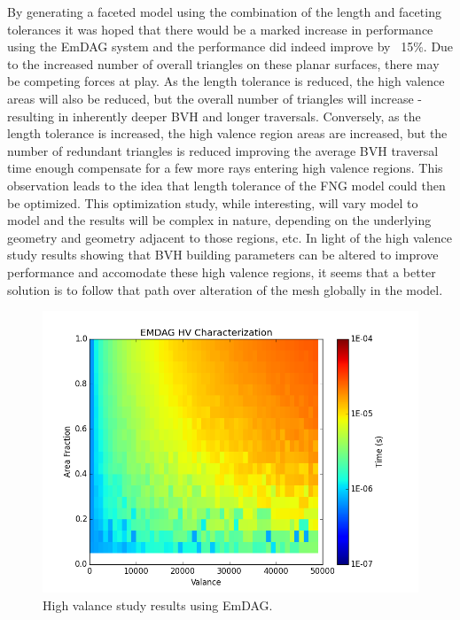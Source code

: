 \documentclass[12pt, a4paper]{article}
\begin{document}
By generating a faceted model using the combination of the length and faceting tolerances it was hoped that there would be a marked increase in performance using the EmDAG system and the performance did indeed improve by ~15\%. Due to the increased number of overall triangles on these planar surfaces, there may be competing forces at play. As the length tolerance is reduced, the high valence areas will also be reduced, but the overall number of triangles will increase - resulting in inherently deeper BVH and longer traversals. Conversely, as the length tolerance is increased, the high valence region areas are increased, but the number of redundant triangles is reduced improving the average BVH traversal time enough compensate for a few more rays entering high valence regions. This observation leads to the idea that length tolerance of the FNG model could then be optimized. This optimization study, while interesting, will vary model to model and the results will be complex in nature, depending on the underlying geometry and geometry adjacent to those regions, etc. In light of the high valence study results showing that BVH building parameters can be altered to improve performance and accomodate these high valence regions, it seems that a better solution is to follow that path over alteration of the mesh globally in the model.


\begin{figure}[H]
  \begin{center}
    \includegraphics[scale=0.55]{hv_emdag.png}
    \caption{High valance study results using EmDAG.}
    \label{emdaghvstudy}
  \end{center}
\end{figure}
\end{document}
